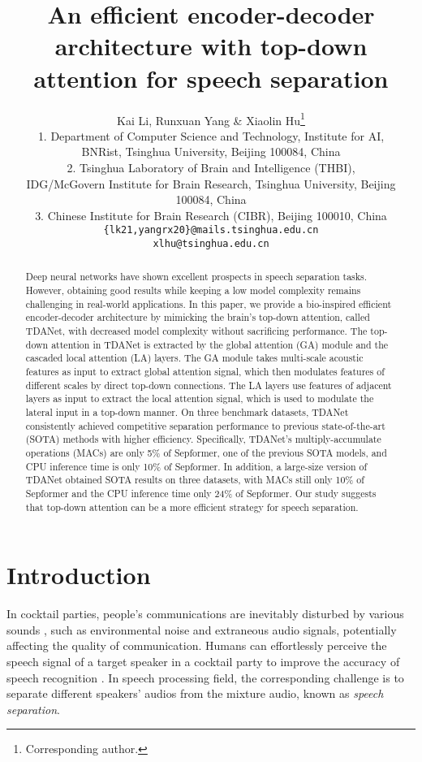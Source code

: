 \documentclass{article} \usepackage{iclr2023_conference,times}
\title{An efficient encoder-decoder architecture with top-down attention for speech separation}
\author{Kai Li, Runxuan Yang \& Xiaolin Hu\thanks{Corresponding author.} \\
1. Department of Computer Science and Technology, Institute for AI,  \\ BNRist,
Tsinghua University, Beijing 100084, China \\
2. Tsinghua Laboratory of Brain and Intelligence (THBI), \\ IDG/McGovern Institute for Brain Research, Tsinghua University, Beijing 100084, China \\
3. Chinese Institute for Brain Research (CIBR), Beijing 100010, China \\
\texttt{\{lk21,yangrx20\}@mails.tsinghua.edu.cn} \\
\texttt{xlhu@tsinghua.edu.cn} \\
}
\begin{document}
\maketitle

\begin{abstract}
Deep neural networks have shown excellent prospects in speech separation tasks. 
However, obtaining good results while keeping a low model complexity remains challenging in real-world applications. 
In this paper, we provide a bio-inspired efficient encoder-decoder architecture by mimicking the brain's top-down attention, called TDANet, with decreased model complexity without sacrificing performance. The top-down attention in TDANet is extracted by the global attention (GA) module and the cascaded local attention (LA) layers. The GA module takes multi-scale acoustic features as input to extract global attention signal, which then modulates features of different scales by direct top-down connections. The LA layers use features of adjacent layers as input to extract the local attention signal, which is used to modulate the lateral input in a top-down manner.
On three benchmark datasets, TDANet consistently achieved competitive separation performance to previous state-of-the-art (SOTA) methods with higher efficiency. Specifically, TDANet's multiply-accumulate operations (MACs) are only 5\% of Sepformer, one of the previous SOTA models, and CPU inference time is only 10\% of Sepformer. In addition, a large-size version of TDANet obtained SOTA results on three datasets, with MACs still only 10\% of Sepformer and the CPU inference time only 24\% of Sepformer.
Our study suggests that top-down attention can be a more efficient strategy for speech separation.
\end{abstract}

\section{Introduction}
In cocktail parties, people's communications are inevitably disturbed by various sounds \citep{bronkhorst2015cocktail, cherry1953some}, such as environmental noise and extraneous audio signals, potentially affecting the quality of communication. Humans can effortlessly perceive the speech signal of a target speaker in a cocktail party to improve the accuracy of speech recognition \citep{haykin2005cocktail}. In speech processing field, the corresponding challenge is to separate different speakers' audios from the mixture audio, known as \textit{speech separation}.
\end{document}
